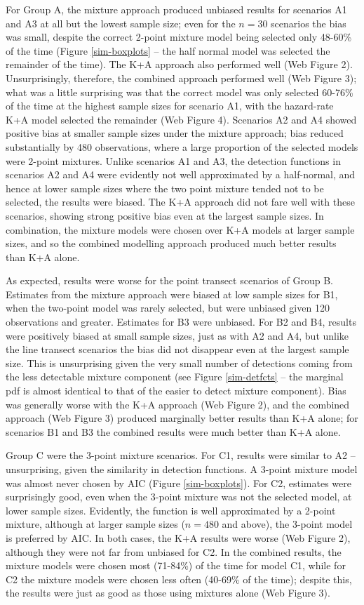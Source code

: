 \documentclass[useAMS,referee,usenatbib]{biom}
\begin{document}
For Group A, the mixture approach produced unbiased results for scenarios A1 and A3 at all but the lowest sample size; even for the $n=30$ scenarios the bias was small, despite the correct 2-point mixture model being selected only 48-60\% of the time (Figure \ref{sim-boxplots} -- the half normal model was selected the remainder of the time).  The K+A approach also performed well (Web Figure 2). Unsurprisingly, therefore, the combined approach performed well (Web Figure 3); what was a little surprising was that the correct model was only selected 60-76\% of the time at the highest sample sizes for scenario A1, with the hazard-rate K+A model selected the remainder (Web Figure 4). Scenarios A2 and A4 showed positive bias at smaller sample sizes under the mixture approach; bias reduced substantially by 480 observations, where a large proportion of the selected models were 2-point mixtures. Unlike scenarios A1 and A3, the detection functions in scenarios A2 and A4 were evidently not well approximated by a half-normal, and hence at lower sample sizes where the two point mixture tended not to be selected, the results were biased. The K+A approach did not fare well with these scenarios, showing strong positive bias even at the largest sample sizes. In combination, the mixture models were chosen over K+A models at larger sample sizes, and so the combined modelling approach produced much better results than K+A alone.  

As expected, results were worse for the point transect scenarios of Group B.  Estimates from the mixture approach were biased at low sample sizes for B1, when the two-point model was rarely selected, but were unbiased given 120 observations and greater.  Estimates for B3 were unbiased.  For B2 and B4, results were positively biased at small sample sizes, just as with A2 and A4, but unlike the line transect scenarios the bias did not disappear even at the largest sample size.  This is unsurprising given the very small number of detections coming from the less detectable mixture component (see Figure \ref{sim-detfcts} -- the marginal pdf is almost identical to that of the easier to detect mixture component). Bias was generally worse with the K+A approach (Web Figure 2), and the combined approach (Web Figure 3) produced marginally better results than K+A alone; for scenarios B1 and B3 the combined results were much better than K+A alone. 

Group C were the 3-point mixture scenarios.  For C1, results were similar to A2 -- unsurprising, given the similarity in detection functions.  A 3-point mixture model was almost never chosen by AIC (Figure \ref{sim-boxplots}).  For C2, estimates were surprisingly good, even when the 3-point mixture was not the selected model, at lower sample sizes.  Evidently, the function is well approximated by a 2-point mixture, although at larger sample sizes ($n=480$ and above), the 3-point model is preferred by AIC. In both cases, the K+A results were worse (Web Figure 2), although they were not far from unbiased for C2.  In the combined results, the mixture models were chosen most (71-84\%) of the time for model C1, while for C2 the mixture models were chosen less often (40-69\% of the time); despite this, the results were just as good as those using mixtures alone (Web Figure 3).
\end{document}
